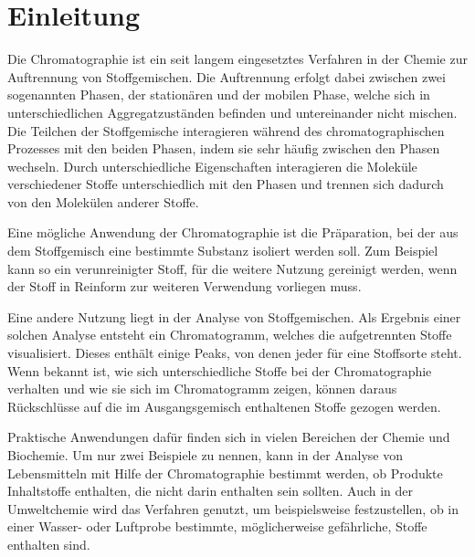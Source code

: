 \label{chapter:ein}

\chapter{Einleitung}


Die Chromatographie ist ein seit langem eingesetztes Verfahren in der Chemie zur Auftrennung von Stoffgemischen. 
Die Auftrennung erfolgt dabei zwischen zwei sogenannten Phasen, der stationären und der mobilen Phase, welche sich in unterschiedlichen Aggregatzuständen befinden und untereinander nicht mischen. Die Teilchen der Stoffgemische interagieren während des chromatographischen Prozesses mit den beiden Phasen, indem sie sehr häufig zwischen den Phasen wechseln. Durch unterschiedliche Eigenschaften interagieren die Moleküle verschiedener Stoffe unterschiedlich mit den Phasen und trennen sich dadurch von den Molekülen anderer Stoffe. 

Eine mögliche Anwendung der Chromatographie ist die Präparation, bei der aus dem Stoffgemisch eine bestimmte Substanz isoliert werden soll. Zum Beispiel kann so ein verunreinigter Stoff, für die weitere Nutzung gereinigt werden, wenn der Stoff in Reinform zur weiteren Verwendung vorliegen muss.

Eine andere Nutzung liegt in der Analyse von Stoffgemischen. Als Ergebnis einer solchen Analyse entsteht ein Chromatogramm, welches die aufgetrennten Stoffe visualisiert. Dieses enthält einige Peaks, von denen jeder für eine Stoffsorte steht. Wenn bekannt ist, wie sich unterschiedliche Stoffe bei der Chromatographie verhalten und wie sie sich im Chromatogramm zeigen, können daraus Rückschlüsse auf die im Ausgangsgemisch enthaltenen Stoffe gezogen werden. 

Praktische Anwendungen dafür finden sich in vielen Bereichen der Chemie und Biochemie. 
Um nur zwei Beispiele zu nennen, kann in der Analyse von Lebensmitteln mit Hilfe der Chromatographie bestimmt werden, ob Produkte Inhaltstoffe enthalten,  die nicht darin enthalten sein sollten. Auch in der Umweltchemie wird das Verfahren genutzt, um beispielsweise festzustellen, ob in einer Wasser- oder Luftprobe bestimmte, möglicherweise gefährliche, Stoffe enthalten sind.

